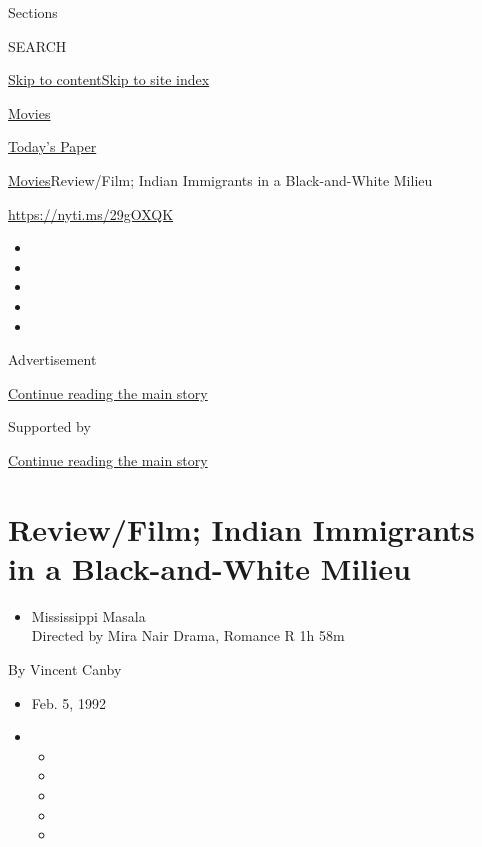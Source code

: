 Sections

SEARCH

\protect\hyperlink{site-content}{Skip to
content}\protect\hyperlink{site-index}{Skip to site index}

\href{https://www.nytimes.com/section/movies}{Movies}

\href{https://myaccount.nytimes.com/auth/login?response_type=cookie\&client_id=vi}{}

\href{https://www.nytimes.com/section/todayspaper}{Today's Paper}

\href{/section/movies}{Movies}\textbar{}Review/Film; Indian Immigrants
in a Black-and-White Milieu

\href{https://nyti.ms/29gOXQK}{https://nyti.ms/29gOXQK}

\begin{itemize}
\item
\item
\item
\item
\item
\end{itemize}

Advertisement

\protect\hyperlink{after-top}{Continue reading the main story}

Supported by

\protect\hyperlink{after-sponsor}{Continue reading the main story}

\hypertarget{reviewfilm-indian-immigrants-in-a-black-and-white-milieu}{%
\section{Review/Film; Indian Immigrants in a Black-and-White
Milieu}\label{reviewfilm-indian-immigrants-in-a-black-and-white-milieu}}

\begin{itemize}
\tightlist
\item
  Mississippi Masala\\
  Directed by Mira Nair Drama, Romance R 1h 58m
\end{itemize}

By Vincent Canby

\begin{itemize}
\item
  Feb. 5, 1992
\item
  \begin{itemize}
  \item
  \item
  \item
  \item
  \item
  \end{itemize}
\end{itemize}

